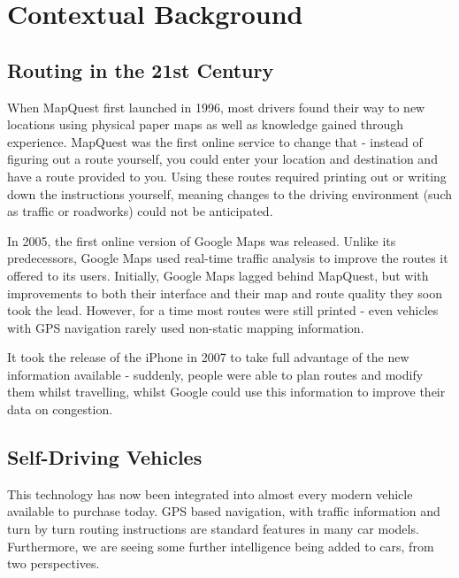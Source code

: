 \documentclass[ %
                    author={Alexander Hill},
                supervisor={Dr. Benjamin Sach},
                    degree={MEng},
                     title={MARMOSET},
                  subtitle={Multi-Agent Route Management using Online Simulation for Efficient Transportation},
                      type={research},
                      year={2016} ]{dissertation}
\begin{document}
\mainmatter


\chapter{Contextual Background}
\label{chap:context}

\vspace{1cm}

\noindent

\section{Routing in the 21st Century} %

When MapQuest first launched in 1996, most drivers found their way to new
locations using physical paper maps as well as knowledge gained through
experience. MapQuest was the first online service to change that - instead of
figuring out a route yourself, you could enter your location and destination and
have a route provided to you. Using these routes required printing
out or writing down the instructions yourself, meaning changes to the driving
environment (such as traffic or roadworks) could not be anticipated.

In 2005, the first online version of Google Maps was released. Unlike its
predecessors, Google Maps used real-time traffic analysis to improve the routes
it offered to its users. Initially, Google Maps lagged behind MapQuest, but with
improvements to both their interface and their map and route quality they soon
took the lead. However, for a time most routes were still printed - even
vehicles with GPS navigation rarely used non-static mapping information.

It took the release of the iPhone in 2007 to take full advantage of the new
information available - suddenly, people were able to plan routes and modify
them whilst travelling, whilst Google could use this information to improve
their data on congestion.

\section{Self-Driving Vehicles}

This technology has now been integrated into almost every modern vehicle
available to purchase today. GPS based navigation, with traffic information and
turn by turn routing instructions are standard features in many car models.
Furthermore, we are seeing some further intelligence being added to cars, from
two perspectives.
\end{document}
